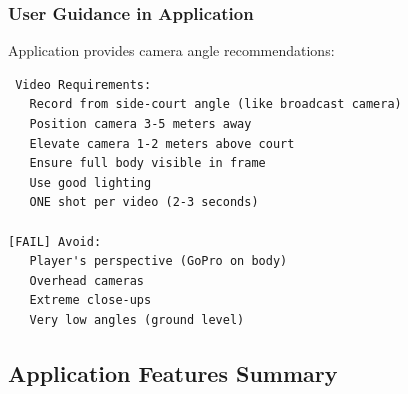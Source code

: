 \documentclass[11pt,a4paper]{article}
\begin{document}
\subsubsection{User Guidance in Application}

Application provides camera angle recommendations:

\begin{verbatim}
 Video Requirements:
   Record from side-court angle (like broadcast camera)
   Position camera 3-5 meters away
   Elevate camera 1-2 meters above court
   Ensure full body visible in frame
   Use good lighting
   ONE shot per video (2-3 seconds)

[FAIL] Avoid:
   Player's perspective (GoPro on body)
   Overhead cameras
   Extreme close-ups
   Very low angles (ground level)
\end{verbatim}

\subsection{Application Features Summary}
\end{document}
